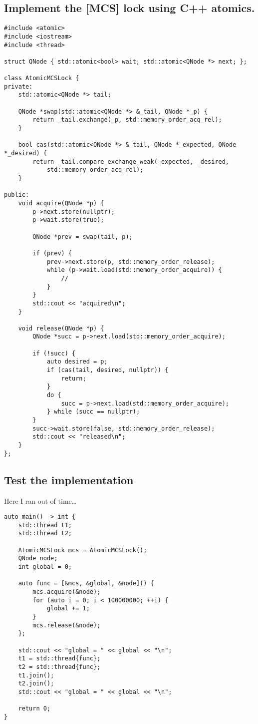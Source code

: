 \documentclass[11pt]{article}
\begin{document}
\subsection{Implement the [MCS] lock using C++ atomics.}
\label{sec:orgf8f5c23}
\begin{verbatim}
#include <atomic>
#include <iostream>
#include <thread>

struct QNode { std::atomic<bool> wait; std::atomic<QNode *> next; };

class AtomicMCSLock {
private:
    std::atomic<QNode *> tail;

    QNode *swap(std::atomic<QNode *> &_tail, QNode *_p) {
        return _tail.exchange(_p, std::memory_order_acq_rel);
    }

    bool cas(std::atomic<QNode *> &_tail, QNode *_expected, QNode *_desired) {
        return _tail.compare_exchange_weak(_expected, _desired,
            std::memory_order_acq_rel);
    }

public:
    void acquire(QNode *p) {
        p->next.store(nullptr);
        p->wait.store(true);

        QNode *prev = swap(tail, p);

        if (prev) {
            prev->next.store(p, std::memory_order_release);
            while (p->wait.load(std::memory_order_acquire)) {
                //
            }
        }
        std::cout << "acquired\n";
    }

    void release(QNode *p) {
        QNode *succ = p->next.load(std::memory_order_acquire);

        if (!succ) {
            auto desired = p;
            if (cas(tail, desired, nullptr)) {
                return;
            }
            do {
                succ = p->next.load(std::memory_order_acquire);
            } while (succ == nullptr);
        }
        succ->wait.store(false, std::memory_order_release);
        std::cout << "released\n";
    }
};
\end{verbatim}
\subsection{Test the implementation}
\label{sec:orga549f97}
Here I ran out of time\dots{}
\begin{verbatim}
auto main() -> int {
    std::thread t1;
    std::thread t2;

    AtomicMCSLock mcs = AtomicMCSLock();
    QNode node;
    int global = 0;

    auto func = [&mcs, &global, &node]() {
        mcs.acquire(&node);
        for (auto i = 0; i < 100000000; ++i) {
            global += 1;
        }
        mcs.release(&node);
    };

    std::cout << "global = " << global << "\n";
    t1 = std::thread{func};
    t2 = std::thread{func};
    t1.join();
    t2.join();
    std::cout << "global = " << global << "\n";

    return 0;
}
\end{verbatim}
\end{document}
